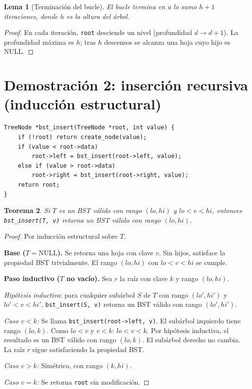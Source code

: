 \documentclass[11pt, letterpaper]{article}
\theoremstyle{definition}
\theoremstyle{plain}
\newtheorem{theorem}{Teorema}[section]
\newtheorem{lemma}[theorem]{Lema}
\theoremstyle{remark}
\begin{document}
\begin{lemma}[Terminación del bucle]\label{lem:loop-term}
El bucle termina en a lo sumo $h + 1$ iteraciones, donde $h$ es la
altura del árbol.
\end{lemma}

\begin{proof}
En cada iteración, \texttt{root} desciende un nivel (profundidad
$d \to d+1$). La profundidad máxima es $h$; tras $h$ descensos se
alcanza una hoja cuyo hijo es NULL.
\end{proof}

\section{Demostración 2: inserción recursiva (inducción estructural)}

\begin{lstlisting}
TreeNode *bst_insert(TreeNode *root, int value) {
    if (!root) return create_node(value);
    if (value < root->data)
        root->left = bst_insert(root->left, value);
    else if (value > root->data)
        root->right = bst_insert(root->right, value);
    return root;
}
\end{lstlisting}

\begin{theorem}\label{thm:recursive}
Si $T$ es un BST válido con rango $(lo, hi)$ y $lo < v < hi$, entonces
\texttt{bst\_insert(T, v)} retorna un BST válido con rango $(lo, hi)$.
\end{theorem}

\begin{proof}
Por inducción estructural sobre $T$.

\textbf{Base ($T = \text{NULL}$).} Se retorna una hoja con clave $v$.
Sin hijos, satisface la propiedad BST trivialmente. El rango
$(lo, hi)$ con $lo < v < hi$ se cumple. \checkmark

\textbf{Paso inductivo ($T$ no vacío).} Sea $r$ la raíz con clave $k$
y rango $(lo, hi)$.

\emph{Hipótesis inductiva}: para cualquier subárbol $S$ de $T$ con
rango $(lo', hi')$ y $lo' < v < hi'$, \texttt{bst\_insert(S, v)}
retorna un BST válido con rango $(lo', hi')$.

\emph{Caso $v < k$:} Se llama \texttt{bst\_insert(root->left, v)}.
El subárbol izquierdo tiene rango $(lo, k)$. Como $lo < v$ y $v < k$:
$lo < v < k$. Por hipótesis inductiva, el resultado es un BST válido
con rango $(lo, k)$. El subárbol derecho no cambia. La raíz $r$ sigue
satisfaciendo la propiedad BST. \checkmark

\emph{Caso $v > k$:} Simétrico, con rango $(k, hi)$. \checkmark

\emph{Caso $v = k$:} Se retorna \texttt{root} sin modificación. \checkmark
\end{proof}
\end{document}
